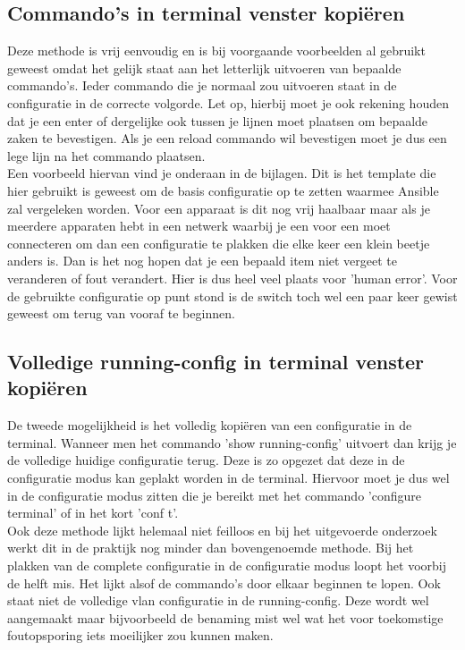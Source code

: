 \subsection{Commando's in terminal venster kopiëren}
\label{sec:commandocopy}
Deze methode is vrij eenvoudig en is bij voorgaande voorbeelden al gebruikt geweest omdat het gelijk staat aan het letterlijk uitvoeren van bepaalde commando's. Ieder commando die je normaal zou uitvoeren staat in de configuratie in de correcte volgorde. Let op, hierbij moet je ook rekening houden dat je een enter of dergelijke ook tussen je lijnen moet plaatsen om bepaalde zaken te bevestigen. Als je een reload commando wil bevestigen moet je dus een lege lijn na het commando plaatsen. 
\\
Een voorbeeld hiervan vind je onderaan in de bijlagen. Dit is het template die hier gebruikt is geweest om de basis configuratie op te zetten waarmee Ansible zal vergeleken worden. Voor een apparaat is dit nog vrij haalbaar maar als je meerdere apparaten hebt in een netwerk waarbij je een voor een moet connecteren om dan een configuratie te plakken die elke keer een klein beetje anders is. Dan is het nog hopen dat je een bepaald item niet vergeet te veranderen of fout verandert. Hier is dus heel veel plaats voor 'human error'. Voor de gebruikte configuratie op punt stond is de switch toch wel een paar keer gewist geweest om terug van vooraf te beginnen.

\subsection{Volledige running-config in terminal venster kopiëren}
\label{sec:configcopy}
De tweede mogelijkheid is het volledig kopiëren van een configuratie in de terminal. Wanneer men het commando 'show running-config' uitvoert dan krijg je de volledige huidige configuratie terug. Deze is zo opgezet dat deze in de configuratie modus kan geplakt worden in de terminal. Hiervoor moet je dus wel in de configuratie modus zitten die je bereikt met het commando 'configure terminal' of in het kort 'conf t'. 
\\

Ook deze methode lijkt helemaal niet feilloos en bij het uitgevoerde onderzoek werkt dit in de praktijk nog minder dan bovengenoemde methode. Bij het plakken van de complete configuratie in de configuratie modus loopt het voorbij de helft mis. Het lijkt alsof de commando's door elkaar beginnen te lopen. Ook staat niet de volledige vlan configuratie in de running-config. Deze wordt wel aangemaakt maar bijvoorbeeld de benaming mist wel wat het voor toekomstige foutopsporing iets moeilijker zou kunnen maken.

